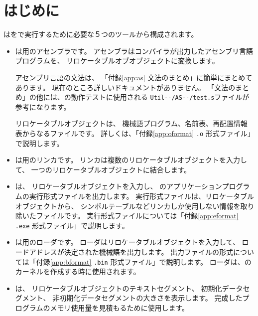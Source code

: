 % 
%
\chapter{はじめに}

\util は\cmml を\tac で実行するために必要な５つのツールから構成されます。


\begin{itemize}
\item {\as}は\tac 用のアセンブラです。
アセンブラは{\cmm}コンパイラが出力したアセンブリ言語プログラムを、
リロケータブルオブオブジェクトに変換します。

アセンブリ言語の文法は、
「付録\ref{app:as} {\as}文法のまとめ」に簡単にまとめてあります。
現在のところ詳しいドキュメントがありません。
「文法のまとめ」の他には、{\as}の動作テストに使用される
\verb;Util--/AS--/test.s;ファイルが参考になります。

リロケータブルオブジェクトは、
機械語プログラム、名前表、再配置情報表からなるファイルです。
詳しくは、「付録\ref{app:oformat} {\tt .o} 形式ファイル」で説明します。

\item {\ld}は\tac 用のリンカです。
リンカは複数のリロケータブルオブジェクトを入力して、
一つのリロケータブルオブジェクトに結合します。

\item {\objexe}は、
リロケータブルオブジェクトを入力し、
{\tacos}のアプリケーションプログラムの実行形式ファイルを出力します。
実行形式ファイルは、リロケータブルオブジェクトから、
シンボルテーブルなどリンカしか使用しない情報を取り除いたファイルです。
実行形式ファイルについては「付録\ref{app:eformat}
{\tt .exe} 形式ファイル」で説明します。

\item {\objbin}は\tac 用のローダです。
ローダはリロケータブルオブジェクトを入力して、
ロードアドレスが決定された機械語を出力します。
出力ファイルの形式については「付録\ref{app:bformat}
{\tt .bin} 形式ファイル」で説明します。
ローダは、{\tacos}のカーネルを作成する時に使用されます。

\item {\size}は、
リロケータブルオブジェクトのテキストセグメント、
初期化データセグメント、
非初期化データセグメントの大きさを表示します。
完成したプログラムのメモリ使用量を見積もるために使用します。
\end{itemize}

